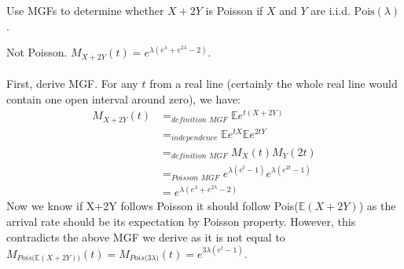 
\setcounter{theorem}{18}
\begin{exercise} [BH.6.19] Use MGFs to determine whether $X + 2Y$ is Poisson if $X$ and $Y$ are i.i.d. $\text{Pois}(\lambda)$.

\begin{solution}
    Not Poisson. $M_{X+2Y}(t)= e^{\lambda(e^\lambda+e^{2\lambda} -2) }$.\\~\\
    First, derive MGF. For any $t$ from a real line (certainly the whole real line would contain one open interval around zero), we have:
    \begin{align*}
    	M_{X+2Y}(t) &=_{\textit{definition MGF}} \mathbb{E} e^{t(X+2Y)} \\&=_{\textit{independence}} \mathbb{E} e^{tX}\mathbb{E} e^{2tY} \\&=_{\textit{definition MGF}} M_{X}(t)M_{Y}(2t) \\&=_{\textit{Poisson MGF}}  e^{\lambda(e^t-1)}e^{\lambda(e^{2t}-1)} \\
    	&= e^{\lambda(e^\lambda+e^{2\lambda} -2) }
    \end{align*}
    Now we know if X+2Y follows Poisson it should follow Pois($\mathbb{E}(X+2Y)$) as the arrival rate should be its expectation by Poisson property. However, this contradicts the above MGF we derive as it is not equal to $M_{\textit{Pois($\mathbb{E}(X+2Y)$)}}(t)=M_{\textit{Pois($3\lambda$)}}(t)= e^{3\lambda(e^t-1)}$.
\end{solution}
\end{exercise}

